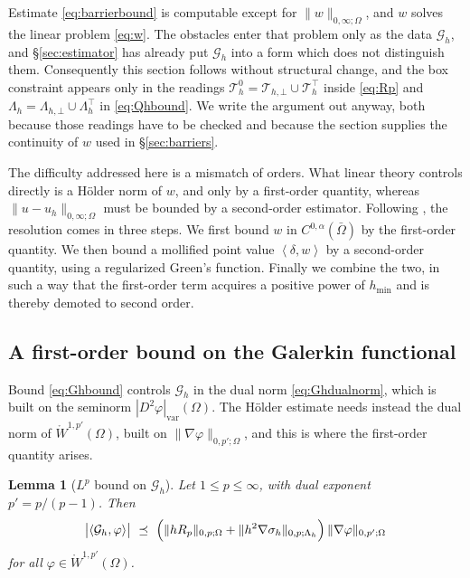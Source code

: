 \documentclass[12pt]{amsart}
\newtheorem{lemma}{Lemma}
\theoremstyle{definition}
\newcommand{\Om}{\Omega}
\newcommand{\Th}{\mathcal{T}_h}
\newcommand{\Thbot}{\mathcal{T}_{h,\bot}}
\newcommand{\Thtop}{\Th^\top}
\newcommand{\Thzero}{\Th^0}
\newcommand{\Gh}{\mathcal{G}_h}
\newcommand{\Lamh}{\Lambda_h}
\newcommand{\Lamhbot}{\Lambda_{h,\bot}}
\newcommand{\Lamhtop}{\Lambda_h^\top}
\begin{document}
Estimate \eqref{eq:barrierbound} is computable except for $\|w\|_{0,\infty;\Om}$, and $w$ solves the linear problem \eqref{eq:w}.  The obstacles enter that problem only as the data $\Gh$, and \S \ref{sec:estimator} has already put $\Gh$ into a form which does not distinguish them.  Consequently this section follows \cite[\S 5]{NSV03} without structural change, and the box constraint appears only in the readings $\Thzero = \Thbot \cup \Thtop$ inside \eqref{eq:Rp} and $\Lamh = \Lamhbot \cup \Lamhtop$ in \eqref{eq:Qhbound}.  We write the argument out anyway, both because those readings have to be checked and because the section supplies the continuity of $w$ used in \S \ref{sec:barriers}.

The difficulty addressed here is a mismatch of orders.  What linear theory controls directly is a H\"older norm of $w$, and only by a first-order quantity, whereas $\|u-u_h\|_{0,\infty;\Om}$ must be bounded by a second-order estimator.  Following \cite[\S 5.1]{NSV03}, the resolution comes in three steps.  We first bound $w$ in $C^{0,\alpha}(\bar\Om)$ by the first-order quantity.  We then bound a mollified point value $\left<\delta,w\right>$ by a second-order quantity, using a regularized Green's function.  Finally we combine the two, in such a way that the first-order term acquires a positive power of $h_{\min}$ and is thereby demoted to second order.


\subsection{A first-order bound on the Galerkin functional}

Bound \eqref{eq:Ghbound} controls $\Gh$ in the dual norm \eqref{eq:Ghdualnorm}, which is built on the seminorm $|D^2\varphi|_{\mathrm{var}}(\Om)$.  The H\"older estimate needs instead the dual norm of $\mathring W^{1,p'}(\Om)$, built on $\|\nabla\varphi\|_{0,p';\Om}$, and this is where the first-order quantity arises.

\begin{lemma}[$L^p$ bound on $\Gh$]
\label{lem:Ghp}
Let $1 \le p \le \infty$, with dual exponent $p' = p/(p-1)$.  Then
\begin{equation}
\label{eq:Ghp}
  \bigl|\left<\Gh,\varphi\right>\bigr| \ \preceq\ \Bigl(\|h R_p\|_{0,p;\Om} + \|h^2\nabla\sigma_h\|_{0,p;\Lamh}\Bigr)\,\|\nabla\varphi\|_{0,p';\Om}
\end{equation}
for all $\varphi \in \mathring W^{1,p'}(\Om)$.
\end{lemma}
\end{document}
